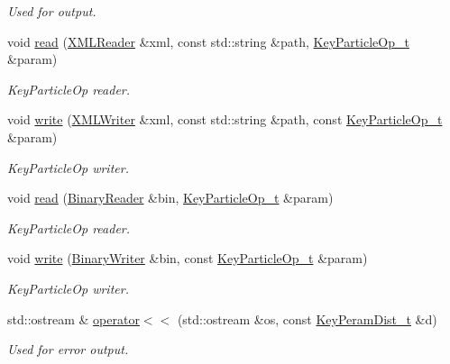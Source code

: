 \begin{DoxyCompactItemize}
\begin{DoxyCompactList}\small\item\em Used for output. \end{DoxyCompactList}\item 
void \mbox{\hyperlink{namespaceHadron_aa490647cc42691054f51d9885e6ec91c}{read}} (\mbox{\hyperlink{classADATXML_1_1XMLReader}{X\+M\+L\+Reader}} \&xml, const std\+::string \&path, \mbox{\hyperlink{structHadron_1_1KeyParticleOp__t}{Key\+Particle\+Op\+\_\+t}} \&param)
\begin{DoxyCompactList}\small\item\em Key\+Particle\+Op reader. \end{DoxyCompactList}\item 
void \mbox{\hyperlink{namespaceHadron_a1aaa6594011475e4142807cfbf0b78e9}{write}} (\mbox{\hyperlink{classADATXML_1_1XMLWriter}{X\+M\+L\+Writer}} \&xml, const std\+::string \&path, const \mbox{\hyperlink{structHadron_1_1KeyParticleOp__t}{Key\+Particle\+Op\+\_\+t}} \&param)
\begin{DoxyCompactList}\small\item\em Key\+Particle\+Op writer. \end{DoxyCompactList}\item 
void \mbox{\hyperlink{namespaceHadron_a22ce4d5ec6f9bf7a3504cb4b7b176c78}{read}} (\mbox{\hyperlink{classADATIO_1_1BinaryReader}{Binary\+Reader}} \&bin, \mbox{\hyperlink{structHadron_1_1KeyParticleOp__t}{Key\+Particle\+Op\+\_\+t}} \&param)
\begin{DoxyCompactList}\small\item\em Key\+Particle\+Op reader. \end{DoxyCompactList}\item 
void \mbox{\hyperlink{namespaceHadron_a4330be9331eb4c839e7e123f5306560b}{write}} (\mbox{\hyperlink{classADATIO_1_1BinaryWriter}{Binary\+Writer}} \&bin, const \mbox{\hyperlink{structHadron_1_1KeyParticleOp__t}{Key\+Particle\+Op\+\_\+t}} \&param)
\begin{DoxyCompactList}\small\item\em Key\+Particle\+Op writer. \end{DoxyCompactList}\item 
std\+::ostream \& \mbox{\hyperlink{namespaceHadron_a42b0be53de314a1cf2c05e7d4d4a34d9}{operator$<$$<$}} (std\+::ostream \&os, const \mbox{\hyperlink{structHadron_1_1KeyPeramDist__t}{Key\+Peram\+Dist\+\_\+t}} \&d)
\begin{DoxyCompactList}\small\item\em Used for error output. \end{DoxyCompactList}\item 

\end{DoxyCompactItemize}
